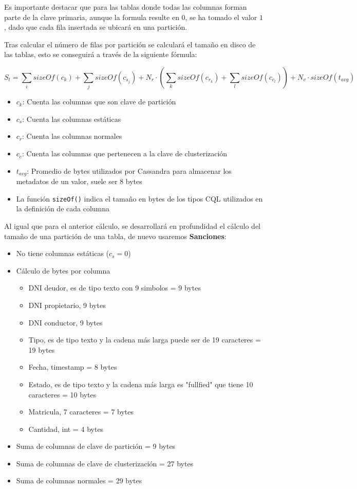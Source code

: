 \documentclass[]{article}
\begin{document}
Es importante destacar que para las tablas donde todas las columnas forman
parte de la clave primaria, aunque la formula resulte en $0$, se ha tomado el
valor $1$, dado que cada fila insertada se ubicará en una partición.

Tras calcular el número de filas por partición se calculará el tamaño en disco
de las tablas, esto se conseguirá a través de la siguiente fórmula: 

$$S_t = \sum_i sizeOf(c_k) + \sum_j sizeOf(c_{s_j}) + N_r \cdot (\sum_k sizeOf(c_{r_k}) + \sum_l sizeOf(c_{c_l})) + N_v \cdot sizeOf(t_{avg})$$

\begin{itemize}
    \item $c_k$: Cuenta las columnas que son clave de partición
    \item $c_s$: Cuenta las columnas estáticas
    \item $c_r$: Cuenta las columnas normales
    \item $c_c$: Cuenta las columnas que pertenecen a la clave de clusterización
    \item $t_{avg}$: Promedio de bytes utilizados por Cassandra para almacenar los metadatos de un valor, suele ser 8 bytes
    \item La función \verb!sizeOf()! indica el tamaño en bytes de los tipos CQL utilizados en la definición de cada columna
\end{itemize}

Al igual que para el anterior cálculo, se desarrollará en profundidad el
cálculo del tamaño de una partición de una tabla, de nuevo usaremos
\textbf{Sanciones}:

\begin{itemize}
    \item No tiene columnas estáticas ($c_s = 0$)
    \item Cálculo de bytes por columna
    \begin{itemize}
        \item DNI deudor, es de tipo texto con 9 simbolos = 9 bytes
        \item DNI propietario, 9 bytes
        \item DNI conductor, 9 bytes
        \item Tipo, es de tipo texto y la cadena más larga puede ser de 19 caracteres = 19 bytes
        \item Fecha, timestamp = 8 bytes
        \item Estado, es de tipo texto y la cadena más larga es "fullfied" que tiene 10 caracteres = 10 bytes
        \item Matricula, 7 caracteres = 7 bytes
        \item Cantidad, int = 4 bytes
    \end{itemize}
    \item Suma de columnas de clave de partición = 9 bytes
    \item Suma de columnas de clave de clusterización = 27 bytes
    \item Suma de columnas normales = 29 bytes
\end{itemize}
\end{document}
